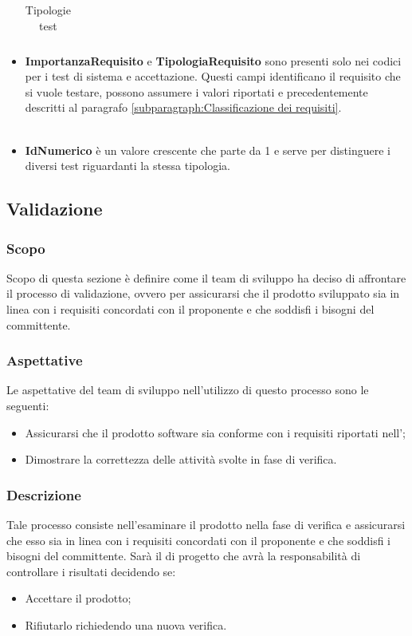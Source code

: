 \begin{itemize}[label={}]
\begin{table}[H]
\begin{tabular}{c|c|p{12cm}}
              \end{tabular}
              \caption{Tipologie test}
          \end{table}
    \item \textbf{ImportanzaRequisito} e \textbf{TipologiaRequisito} sono presenti solo nei codici per i test di sistema e accettazione. Questi campi identificano il requisito che si vuole testare, possono assumere i valori riportati e precedentemente descritti al paragrafo \ref{subparagraph:Classificazione dei requisiti}.\\\\
    \item \textbf{IdNumerico} è un valore crescente che parte da 1 e serve per distinguere i diversi test riguardanti la stessa tipologia.
\end{itemize}


\pagebreak

\subsection{Validazione}\label{subsection: validazione}
\subsubsection{Scopo}
Scopo di questa sezione è definire come il team di sviluppo ha deciso di affrontare il processo di validazione, ovvero per assicurarsi che il prodotto sviluppato sia in linea con i requisiti concordati con il proponente e che soddisfi i bisogni del committente.
\subsubsection{Aspettative}
Le aspettative del team di sviluppo nell'utilizzo di questo processo sono le seguenti:
\begin{itemize}
    \item Assicurarsi che il prodotto software sia conforme con i requisiti riportati nell'\docNameAdRLow;
    \item  Dimostrare la correttezza delle attività svolte in fase di verifica.
\end{itemize}
\subsubsection{Descrizione}
Tale processo consiste nell'esaminare il prodotto nella fase di verifica e assicurarsi che esso sia in linea con i requisiti concordati con il proponente e che soddisfi i bisogni del committente.
Sarà il \roleProjectManagerLow{} di progetto che avrà la responsabilità di controllare i risultati decidendo se:
\begin{itemize}
    \item Accettare il prodotto;
    \item Rifiutarlo richiedendo una nuova verifica.
\end{itemize}